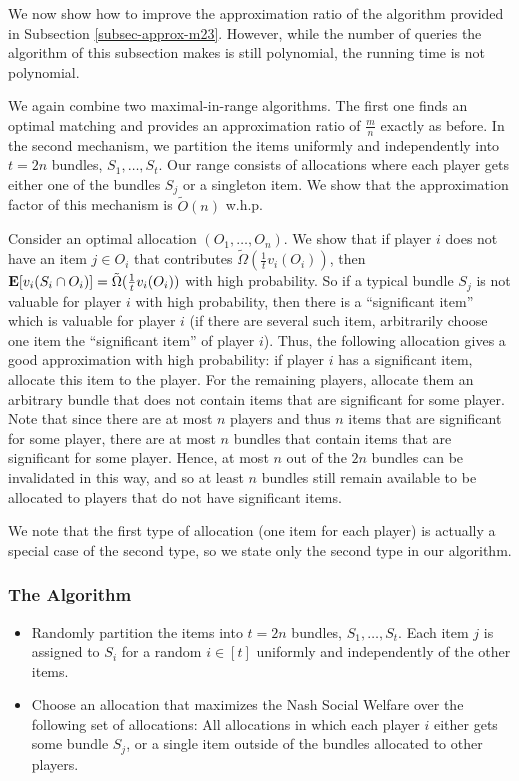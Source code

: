 \documentclass{article}
\newcommand{\E}{\mbox{\bf E}}
\begin{document}
We now show how to improve the approximation ratio of the algorithm provided in Subsection \ref{subsec-approx-m23}. However, while the number of queries the algorithm of this subsection makes is still polynomial, the running time is not polynomial. 

We again combine two maximal-in-range algorithms. The first one finds an optimal matching and provides an approximation ratio of $\frac m n$ exactly as before. In the second mechanism, we partition the items uniformly and independently into $t=2n$ bundles, $S_1,\ldots, S_t$. Our range consists of allocations where each player gets either one of the bundles $S_j$ or a singleton item. We show that the approximation factor of this mechanism is $\tilde{O}(n)$ w.h.p.

Consider an optimal allocation $(O_1,\ldots,O_n)$. We show that if player $i$ does not have an item $j\in O_i$ that contributes  $\tilde{\Omega}(\frac{1}{t} v_i(O_i))$, then $\E[v_i(S_i \cap O_i)] = \tilde{\Omega}(\frac{1}{t} v_i(O_i))$ with high probability. So if a typical bundle $S_j$ is not valuable for player $i$ with high probability, then there is a ``significant item'' which is valuable for player $i$ (if there are several such item, arbitrarily choose one item the ``significant item'' of player $i$). Thus, the following allocation gives a good approximation with high probability: if player $i$ has a significant item, allocate this item to the player. For the remaining players, allocate them an arbitrary bundle that does not contain items that are significant for some player. Note that since there are at most $n$ players and thus $n$ items that are significant for some player, there are at most $n$ bundles that contain items that are significant for some player. Hence, at most $n$ out of the $2n$ bundles can be invalidated in this way, and so at least $n$ bundles still remain available to be allocated to players that do not have significant items.

We note that the first type of allocation (one item for each player) is actually a special case of the second type, so we state only the second type in our algorithm.

\subsubsection*{The Algorithm}

\begin{itemize}
\item Randomly partition the items into $t=2n$ bundles, $S_1,\ldots, S_{t}$. Each item $j$ is assigned to $S_i$ for a random $i \in [t]$ uniformly and independently of the other items.
\item Choose an allocation that maximizes the Nash Social Welfare over the following set of allocations:
All allocations in which each player $i$ either gets some bundle $S_j$, or a single item outside of the bundles allocated to other players.
\end{itemize}
\end{document}
